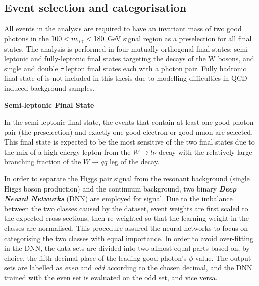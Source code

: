 {\subsection{Event selection and categorisation}

All events in the analysis are required to have an invariant mass of two good photons in the $100<m_{\gamma\gamma}<180$ GeV signal region as a preselection for all final states. The analysis is performed in four mutually orthogonal final states; semi-leptonic and fully-leptonic final states targeting the decays of the W bosons, and single and double $\tau$ lepton final states each with a photon pair. Fully hadronic final state of \wwgg is not included in this thesis due to modelling difficulties in QCD induced background samples.

\textbf{Semi-leptonic Final State}

In the semi-leptonic final state, the events that contain at least one good photon pair (the preselection) and exactly one good electron or good muon are selected. This final state is expected to be the most sensitive of the two \wwgg final states due to the mix of a high energy lepton from the $W{\rightarrow}l\nu$ decay with the relatively large branching fraction of the $W{\rightarrow}qq$ leg of the decay.

In order to separate the Higgs pair signal from the resonant background (single Higgs boson production) and the continuum background, two binary \emph{\textbf{Deep Neural Networks}} (DNN) are employed for signal. Due to the imbalance between the two classes caused by the dataset, event weights are first scaled to the expected cross sections, then re-weighted so that the learning weight in the classes are normalised. This procedure assured the neural networks to focus on categorising the two classes with equal importance. In order to avoid over-fitting in the DNN, the data sets are divided into two almost equal parts based on, by choice, the fifth decimal place of the leading good photon's $\phi$ value. The output sets are labelled as \emph{even} and \emph{odd} according to the chosen decimal, and the DNN trained with the even set is evaluated on the odd set, and vice versa.

}
